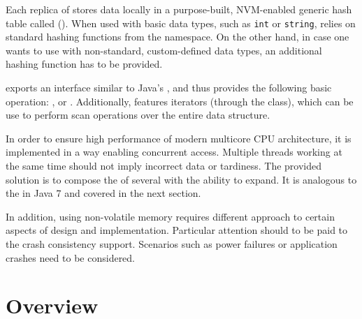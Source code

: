     
    Each replica of \DHT stores data locally in a purpose-built, NVM-enabled generic hash table called \emph{\PersistentHashTable} (\PHT). When used with basic data types, such as \texttt{int} or \texttt{string}, \PHT relies on 
    standard hashing functions from the \std namespace. On the other hand, in case one wants to use \PHT with non-standard, custom-defined data types, an additional hashing function has to be provided.
    
    \PHT exports an interface similar to Java's \HashMap \cite{HashMapJava}, and thus provides the following basic operation: \insertMethod, \getMethod or \removeMethod. Additionally, \PHT features iterators (through the \Iterator class), which can be use to perform scan operations over the entire data structure.
    
    
    In order to ensure high performance of modern multicore CPU architecture, it is implemented in a way enabling concurrent access. 
    Multiple threads working at the same time should not imply incorrect data or tardiness. 
    The provided solution is to compose the \NvmHashMap of several \internalHashMaps with the ability to expand.
    It is analogous to the \ConcurrentHashMap in Java 7 \cite{ConcurrentHashMapJava} and covered in the next section.
    
    In addition, using non-volatile memory requires different approach to certain aspects of design and implementation.
    Particular attention should to be paid to the crash consistency support. 
    Scenarios such as power failures or application crashes need to be considered.
    
\section{Overview}

